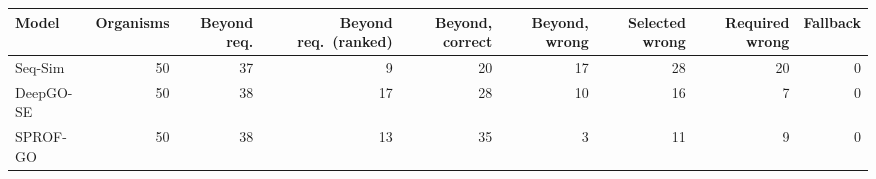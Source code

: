 \begin{tabular}{lrrrrrrrr}
\toprule
Model & Organisms & Beyond req. & Beyond req.\ (ranked) & Beyond, correct & Beyond, wrong & Selected wrong & Required wrong & Fallback \\
\midrule
Seq-Sim & 50 & 37 & 9 & 20 & 17 & 28 & 20 & 0 \\
DeepGO-SE & 50 & 38 & 17 & 28 & 10 & 16 & 7 & 0 \\
SPROF-GO & 50 & 38 & 13 & 35 & 3 & 11 & 9 & 0 \\
\bottomrule
\end{tabular}
